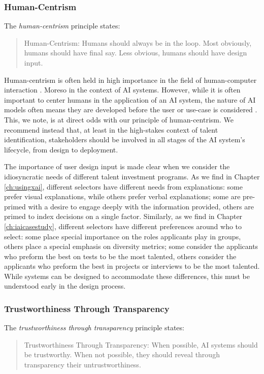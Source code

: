 \subsubsection{Human-Centrism}
The \emph{human-centrism} principle states:

\begin{quote}
    Human-Centrism: Humans should always be in the loop. Most obviously, humans should have final say. Less obvious, humans should have design input.
\end{quote}

Human-centrism is often held in high importance in the field of human-computer interaction \cite{findasource}. Moreso in the context of AI systems. However, while it is often important to center humans in the application of an AI system, the nature of AI models often means they are developed before the user or use-case is considered \cite{findasource}. This, we note, is at direct odds with our principle of human-centrism. We recommend instead that, at least in the high-stakes context of talent identification, stakeholders should be involved in all stages of the AI system's lifecycle, from design to deployment.

The importance of user design input is made clear when we consider the idiosyncratic needs of different talent investment programs. As we find in Chapter \ref{ch:usingxai}, different selectors have different needs from explanations: some prefer visual explanations, while others prefer verbal explanations; some are pre-primed with a desire to engage deeply with the information provided, others are primed to index decisions on a single factor. Similarly, as we find in Chapter \ref{ch:iaicasestudy}, different selectors have different preferences around who to select: some place special importance on the roles applicants play in groups, others place a special emphasis on diversity metrics; some consider the applicants who preform the best on tests to be the most talented, others consider the applicants who preform the best in projects or interviews to be the most talented. While systems can be designed to accommodate these differences, this must be understood early in the design process.

\subsubsection{Trustworthiness Through Transparency}
The \emph{trustworthiness through transparency} principle states:

\begin{quote}
    Trustworthiness Through Transparency: When possible, AI systems should be trustworthy. When not possible, they should reveal through transparency their untrustworthiness.
\end{quote}

